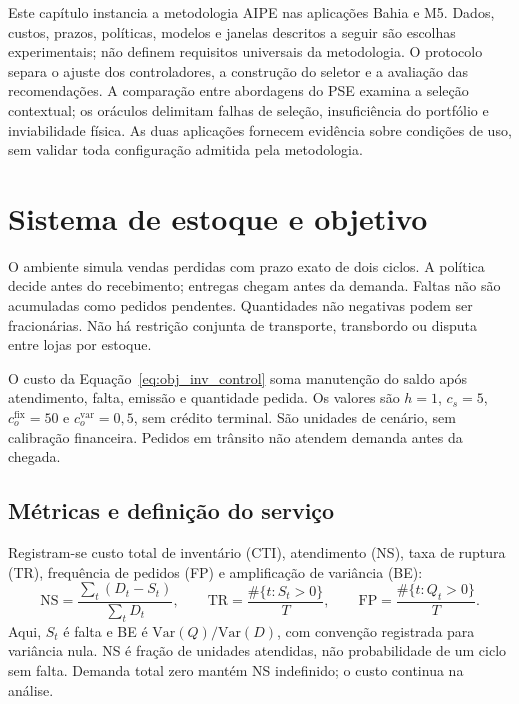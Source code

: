 
Este capítulo instancia a metodologia AIPE nas aplicações Bahia e M5. Dados, custos, prazos, políticas, modelos e janelas descritos a seguir são escolhas experimentais; não definem requisitos universais da metodologia. O protocolo separa o ajuste dos controladores, a construção do seletor e a avaliação das recomendações. A comparação entre abordagens do PSE examina a seleção contextual; os oráculos delimitam falhas de seleção, insuficiência do portfólio e inviabilidade física. As duas aplicações fornecem evidência sobre condições de uso, sem validar toda configuração admitida pela metodologia.

\section{Sistema de estoque e objetivo}
\label{sec:instanciacao_ambiente}\label{sec:ambiente_simulacao}
O ambiente simula vendas perdidas com prazo exato de dois ciclos. A política decide antes do recebimento; entregas chegam antes da demanda. Faltas não são acumuladas como pedidos pendentes. Quantidades não negativas podem ser fracionárias. Não há restrição conjunta de transporte, transbordo ou disputa entre lojas por estoque.

O custo da Equação~\ref{eq:obj_inv_control} soma manutenção do saldo após atendimento, falta, emissão e quantidade pedida. Os valores são $h=1$, $c_s=5$, $c_o^{\mathrm{fix}}=50$ e $c_o^{\mathrm{var}}=0{,}5$, sem crédito terminal. São unidades de cenário, sem calibração financeira. Pedidos em trânsito não atendem demanda antes da chegada.

\subsection{Métricas e definição do serviço}
\label{sec:metricas_avaliacao}
Registram-se custo total de inventário (CTI), atendimento (NS), taxa de ruptura (TR), frequência de pedidos (FP) e amplificação de variância (BE):
\[
 \mathrm{NS}=\frac{\sum_t(D_t-S_t)}{\sum_tD_t},\qquad
 \mathrm{TR}=\frac{\#\{t:S_t>0\}}T,\qquad
 \mathrm{FP}=\frac{\#\{t:Q_t>0\}}T.
\]
Aqui, $S_t$ é falta e BE é $\mathrm{Var}(Q)/\mathrm{Var}(D)$, com convenção registrada para variância nula. NS é fração de unidades atendidas, não probabilidade de um ciclo sem falta. Demanda total zero mantém NS indefinido; o custo continua na análise.

